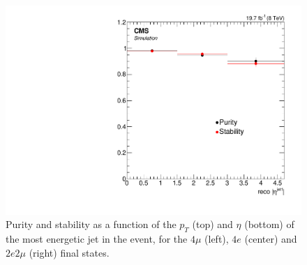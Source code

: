 \begin{figure}[hbtp]
\begin{center}
    \includegraphics[width=0.8\cmsFigWidth]{Figures/Unfolding/BinMigration/PurityStability_2e2m_EtaJet1_Mad}
 \caption{Purity and stability as a function of the $p_T$ (top) and $\eta$ (bottom) of the most energetic jet in the event,  for the $4\mu$ (left), $4e$ (center) and $2e2\mu$ (right) final states.}
    \label{fig:ps_jet1}
  \end{center}
\end{figure}
